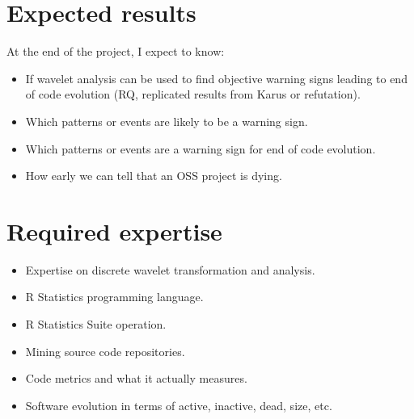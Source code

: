 


\section{Expected results}
At the end of the project, I expect to know:
\begin{itemize}
	\item If wavelet analysis can be used to find objective warning signs leading
	to end of code evolution (RQ, replicated results from Karus or refutation).
	\item Which patterns or events are likely to be a warning sign.
	\item Which patterns or events are a warning sign for end of code evolution.
	\item How early we can tell that an OSS project is dying.
\end{itemize}

\section{Required expertise}
\begin{itemize}
	\item Expertise on discrete wavelet transformation and analysis.
	\item R Statistics programming language.
	\item R Statistics Suite operation.
	\item Mining source code repositories.
	\item Code metrics and what it actually measures.
	\item Software evolution in terms of active, inactive, dead, size, etc.
\end{itemize}

